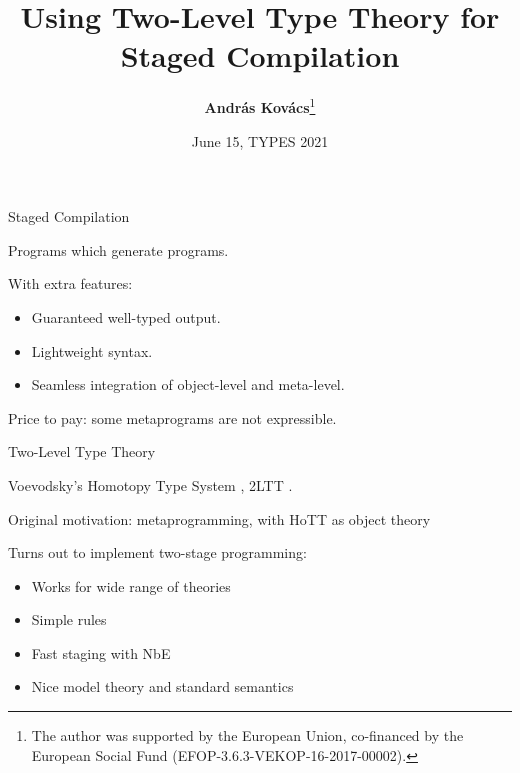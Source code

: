 \documentclass[dvipsnames,10pt,aspectratio=169]{beamer}
\title{Using Two-Level Type Theory for Staged Compilation}
\date{June 15, TYPES 2021}
\author{\normalsize{\vspace{-1em}\textbf{András Kovács}\footnote{The author was supported by the European Union,
co-financed by the European Social Fund (EFOP-3.6.3-VEKOP-16-2017-00002).\vspace{0.5em}}}}
\begin{document}
\maketitle


\begin{frame}{Staged Compilation}

Programs which generate programs.
\vspace{1em}
\pause

With extra features:
\begin{itemize}
  \item Guaranteed well-typed output.
  \item Lightweight syntax.
  \item Seamless integration of object-level and meta-level.
\end{itemize}
\pause

Price to pay: some metaprograms are not expressible.

\end{frame}


\begin{frame}{Two-Level Type Theory}

Voevodsky's Homotopy Type System \cite{voevodsky2013simple}, 2LTT \cite{twolevel}.
\vspace{1em}

Original motivation: metaprogramming, with HoTT as object theory
\vspace{1em}
\pause

Turns out to implement two-stage programming:
\begin{itemize}
  \item Works for wide range of theories
  \pause
  \item Simple rules
  \pause
  \item Fast staging with NbE
  \pause
  \item Nice model theory and standard semantics
\end{itemize}

\end{frame}
\end{document}
